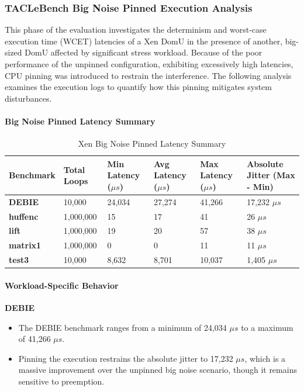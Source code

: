 \subsubsection{TACLeBench Big Noise Pinned Execution
Analysis}\label{taclebench-big-noise-pinned-execution-analysis-1}

This phase of the evaluation investigates the determinism and worst-case
execution time (WCET) latencies of a Xen DomU in the presence of
another, big-sized DomU affected by significant stress workload. Because
of the poor performance of the unpinned configuration, exhibiting
excessively high latencies, CPU pinning was introduced to restrain the
interference. The following analysis examines the execution logs to
quantify how this pinning mitigates system disturbances.

\paragraph{Big Noise Pinned Latency
Summary}\label{big-noise-pinned-latency-summary-1}

\begin{table}
\centering
\caption{Xen Big Noise Pinned Latency Summary}
\label{tab:xen:big-noise-pinned}
\begin{tabularx}{\linewidth}{@{}YYYYYY@{}}
\toprule
Benchmark & Total Loops & Min Latency ($\mu s$) & Avg Latency ($\mu s$) & Max Latency ($\mu s$) & Absolute Jitter (Max - Min)\tabularnewline
\midrule
\textbf{DEBIE} & 10,000 & 24,034 & 27,274 & 41,266 & 17,232 $\mu s$\tabularnewline
\textbf{huffenc} & 1,000,000 & 15 & 17 & 41 & 26 $\mu s$\tabularnewline
\textbf{lift} & 1,000,000 & 19 & 20 & 57 & 38 $\mu s$\tabularnewline
\textbf{matrix1} & 1,000,000 & 0 & 0 & 11 & 11 $\mu s$\tabularnewline
\textbf{test3} & 10,000 & 8,632 & 8,701 & 10,037 & 1,405 $\mu s$\tabularnewline
\bottomrule
\end{tabularx}
\end{table}

\paragraph{Workload-Specific
Behavior}\label{workload-specific-behavior-7}

\textbf{DEBIE}

\begin{itemize}
\item
  The DEBIE benchmark ranges from a minimum of 24,034 $\mu s$ to a maximum of
  41,266 $\mu s$.
\item
  Pinning the execution restrains the absolute jitter to 17,232 $\mu s$,
  which is a massive improvement over the unpinned big noise scenario,
  though it remains sensitive to preemption.
\end{itemize}

